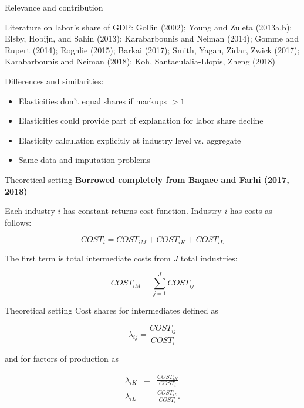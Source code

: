 \documentclass[10pt, xcolor=dvipsnames]{beamer}
\begin{document}
\begin{frame}{Relevance and contribution}

Literature on labor's share of GDP: Gollin (2002); Young and Zuleta (2013a,b); Elsby, Hobijn, and Sahin (2013); Karabarbounis and Neiman (2014); Gomme and Rupert (2014); Rognlie (2015); Barkai (2017); Smith, Yagan, Zidar, Zwick (2017); Karabarbounis and Neiman (2018); Koh, Santaeulalia-Llopis, Zheng (2018)

\vspace{.25in}
Differences and similarities:
\begin{itemize}
  \item Elasticities don't equal shares if markups $>1$
  \item Elasticities could provide part of explanation for labor share decline
  \item Elasticity calculation explicitly at industry level vs. aggregate
  \item Same data and imputation problems
\end{itemize}

\end{frame}




\begin{frame}{Theoretical setting}
\textbf{Borrowed completely from Baqaee and Farhi (2017, 2018)}
\vspace{.25in}

Each industry $i$ has constant-returns cost function. Industry $i$ has costs as follows:

\begin{equation}
  COST_i = COST_{iM} + COST_{iK} + COST_{iL}
\end{equation}

The first term is total intermediate costs from $J$ total industries:

\begin{equation}
  COST_{iM} = \sum_{j=1}^{J} COST_{ij}
\end{equation}

\end{frame}

\begin{frame}{Theoretical setting}
Cost shares for intermediates defined as

\begin{equation}
  \lambda_{ij} = \frac{COST_{ij}}{COST_i}
\end{equation}

and for factors of production as 

\begin{eqnarray}
  \lambda_{iK} &=& \frac{COST_{iK}}{COST_i} \\
  \lambda_{iL} &=& \frac{COST_{iL}}{COST_i}.
\end{eqnarray}

\end{frame}
\end{document}
